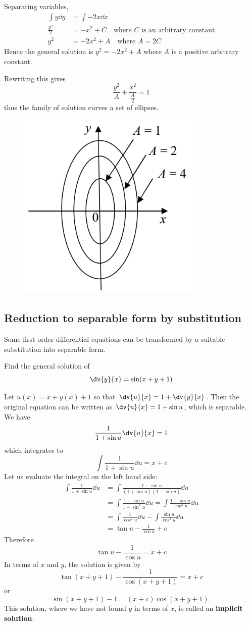 \begin{solution}
Separating variables,
\begin{align*}
\int y\dd{y}&=\int-2x\dd{x}\\
\frac{y^2}{2}&=-x^2+C\quad\text{where $C$ is an arbitrary constant}\\
y^2&=-2x^2+A\quad\text{where $A=2C$}
\end{align*}
Hence the general solution is $y^2=-2x^2+A$ where $A$ is a positive arbitrary constant.

Rewriting this gives 
\[ \frac{y^2}{A}+\frac{x^2}{\frac{A}{2}}=1 \]
thus the family of solution curves a set of ellipses.

\begin{figure}[H]
    \centering
    \includegraphics[width=0.3\linewidth]{images/family-soln.png}
\end{figure}
\end{solution}

\subsection{Reduction to separable form by substitution}
Some first order differential equations can be transformed by a suitable substitution into separable form.

\begin{exercise}
Find the general solution of
\[ \dv{y}{x} = \sin(x+y+1) \]
\end{exercise}

\begin{solution}
Let $u(x) = x + y(x) + 1$ so that $\dv{u}{x} = 1 + \dv{y}{x}$. Then the original equation can be written as $\dv{u}{x} = 1 + \sin u$, which is separable. We have
\[ \frac{1}{1+\sin u}\dv{u}{x} = 1 \]
which integrates to
\[ \int \frac{1}{1+\sin u} \dd{u} = x+c \]
Let us evaluate the integral on the left hand side:
\begin{align*}
\int \frac{1}{1+\sin u} \dd{u}
&= \int \frac{1-\sin u}{(1+\sin u)(1-\sin u)} \dd{u} \\
&= \int \frac{1-\sin u}{1-\sin^2u} \dd{u} = \int \frac{1-\sin u}{\cos^2u} \dd{u} \\
&= \int \frac{1}{\cos^2u} \dd{u} - \int \frac{\sin u}{\cos^2u} \dd{u} \\
&= \tan u - \frac{1}{\cos u} + c
\end{align*}
Therefore 
\[ \tan u - \frac{1}{\cos u} = x+c \]
In terms of $x$ and $y$, the solution is given by
\[ \tan (x+y+1) - \frac{1}{\cos (x+y+1)} = x+c \]
or
\[ \sin (x+y+1) - 1 = (x+c) \cos (x+y+1). \]
This solution, where we have not found $y$ in terms of $x$, is called an \textbf{implicit solution}.
\end{solution}


